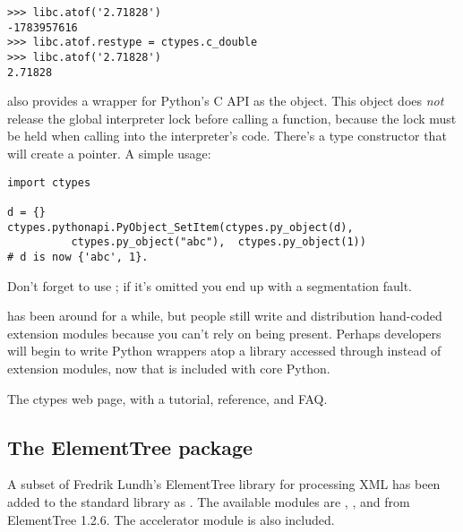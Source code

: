\documentclass{howto}
\begin{document}
\begin{verbatim}
>>> libc.atof('2.71828')
-1783957616
>>> libc.atof.restype = ctypes.c_double
>>> libc.atof('2.71828')
2.71828
\end{verbatim}

 also provides a wrapper for Python's C API 
as the  object.  This object does \emph{not} 
release the global interpreter lock before calling a function, because the lock must be held when calling into the interpreter's code.  
There's a  type constructor that will create a 
 pointer.  A simple usage:

\begin{verbatim}
import ctypes

d = {}
ctypes.pythonapi.PyObject_SetItem(ctypes.py_object(d),
          ctypes.py_object("abc"),  ctypes.py_object(1))
# d is now {'abc', 1}.
\end{verbatim}

Don't forget to use ; if it's omitted you end 
up with a segmentation fault.

 has been around for a while, but people still write 
and distribution hand-coded extension modules because you can't rely on  being present.
Perhaps developers will begin to write 
Python wrappers atop a library accessed through  instead
of extension modules, now that  is included with core Python.

\begin{seealso}

{The ctypes web page, with a tutorial, reference, and FAQ.}

\end{seealso}


\subsection{The ElementTree package\label{module-etree}}

A subset of Fredrik Lundh's ElementTree library for processing XML has
been added to the standard library as .  The
available modules are
, , and
 from ElementTree 1.2.6.   
The  accelerator module is also included. 
\end{document}
